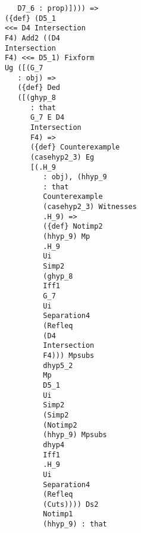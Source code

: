 \documentclass[12pt]{article}
\begin{document}
\begin{verbatim}
                                  D7_6 : prop)]))) => 
                               ({def} (D5_1 
                               <<= D4 Intersection 
                               F4) Add2 ((D4 
                               Intersection 
                               F4) <<= D5_1) Fixform 
                               Ug ([(G_7 
                                  : obj) => 
                                  ({def} Ded 
                                  ([(ghyp_8 
                                     : that 
                                     G_7 E D4 
                                     Intersection 
                                     F4) => 
                                     ({def} Counterexample 
                                     (casehyp2_3) Eg 
                                     [(.H_9 
                                        : obj), (hhyp_9 
                                        : that 
                                        Counterexample 
                                        (casehyp2_3) Witnesses 
                                        .H_9) => 
                                        ({def} Notimp2 
                                        (hhyp_9) Mp 
                                        .H_9 
                                        Ui 
                                        Simp2 
                                        (ghyp_8 
                                        Iff1 
                                        G_7 
                                        Ui 
                                        Separation4 
                                        (Refleq 
                                        (D4 
                                        Intersection 
                                        F4))) Mpsubs 
                                        dhyp5_2 
                                        Mp 
                                        D5_1 
                                        Ui 
                                        Simp2 
                                        (Simp2 
                                        (Notimp2 
                                        (hhyp_9) Mpsubs 
                                        dhyp4 
                                        Iff1 
                                        .H_9 
                                        Ui 
                                        Separation4 
                                        (Refleq 
                                        (Cuts)))) Ds2 
                                        Notimp1 
                                        (hhyp_9) : that 

\end{verbatim}
\end{document}
